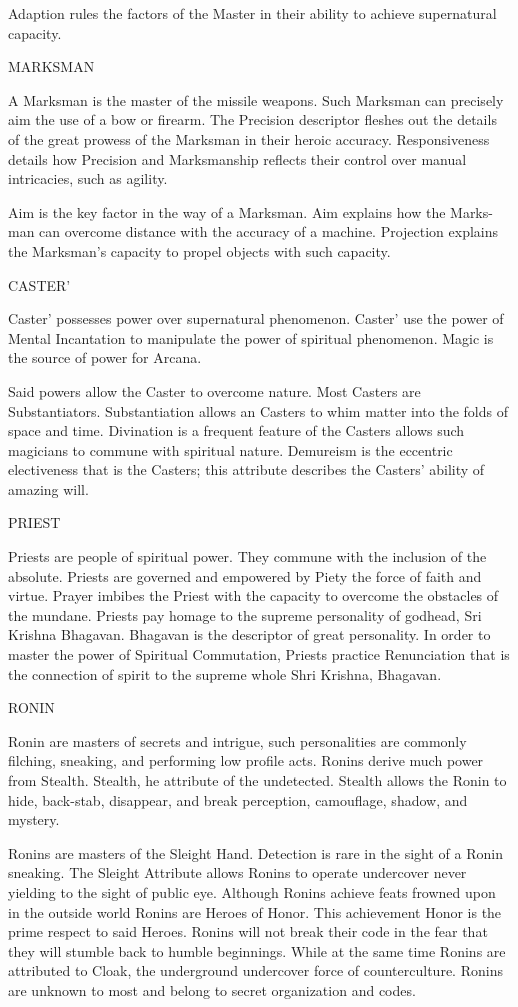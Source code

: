 \documentclass{article}
\begin{document}
    Adaption rules the factors of the Master in their ability to achieve supernatural capacity.

MARKSMAN

	A Marksman is the master of the missile weapons. Such Marksman can precisely aim the use of
a bow or firearm. The Precision descriptor fleshes out the details of the great prowess of the
Marksman in their heroic accuracy. Responsiveness details how Precision and Marksmanship
reflects their control over manual intricacies, such as agility.

	Aim is the key factor in the way of a Marksman. Aim explains how the Marks- man can
overcome distance with the accuracy of a machine. Projection explains the Marksman’s capacity
to propel objects with such capacity.

CASTER’

	Caster’ possesses power over supernatural phenomenon. Caster’ use the power of Mental
Incantation to manipulate the power of spiritual phenomenon. Magic is the source of power for
Arcana.

	Said powers allow the Caster to overcome nature. Most Casters are Substantiators. Substantiation
allows an Casters to whim matter into the folds of space and time. Divination is a frequent
feature of the Casters allows such magicians to commune with spiritual nature. Demureism is the
eccentric electiveness that is the Casters; this attribute describes the Casters’ ability of amazing
will.

PRIEST

Priests are people of spiritual power. They commune with the inclusion of the absolute.
Priests are governed and empowered by Piety the force of faith and virtue. Prayer imbibes the
Priest with the capacity to overcome the obstacles of the mundane. Priests pay homage to the
supreme personality of godhead, Sri Krishna Bhagavan. Bhagavan is the descriptor of great
personality. In order to master the power of Spiritual Commutation, Priests practice Renunciation
that is the connection of spirit to the supreme whole Shri Krishna, Bhagavan.

RONIN

	Ronin are masters of secrets and intrigue, such personalities are commonly filching, sneaking,
and performing low profile acts. Ronins derive much power from Stealth.
Stealth, he attribute of the undetected. Stealth allows the Ronin to hide, back-stab, disappear, and
break perception, camouflage, shadow, and mystery.

	Ronins are masters of the Sleight Hand. Detection is rare in the sight of a Ronin sneaking. The
Sleight Attribute allows Ronins to operate undercover never yielding to the sight of public eye.
Although Ronins achieve feats frowned upon in the outside world Ronins are Heroes of Honor.
This achievement Honor is the prime respect to said Heroes. Ronins will not break their code in
the fear that they will stumble back to humble beginnings. While at the same time Ronins are
attributed to Cloak, the underground undercover force of counterculture. Ronins are unknown to
most and belong to secret organization and codes.
\end{document}

